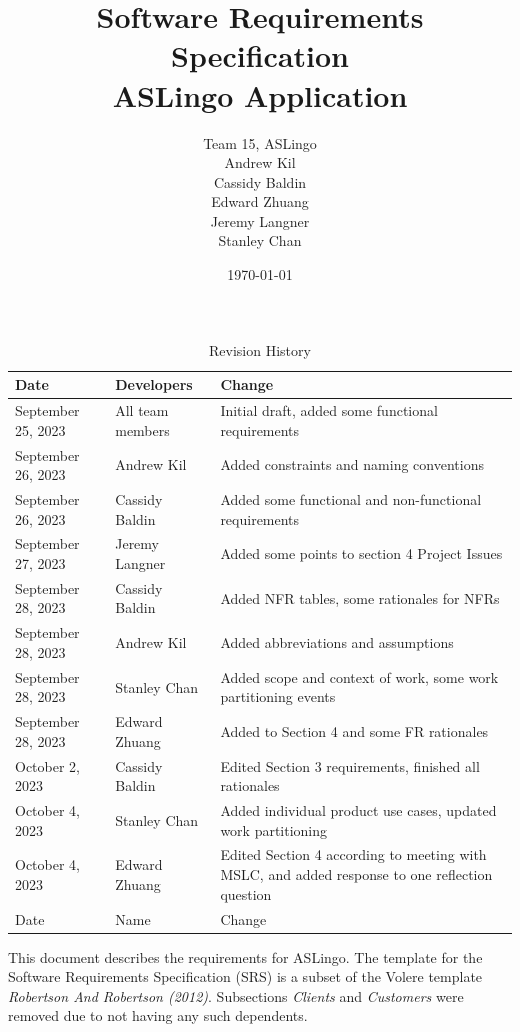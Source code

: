 \documentclass[12pt, titlepage]{article}
\title{Software Requirements Specification\\ASLingo Application}
\author{Team 15, ASLingo
		\\ Andrew Kil
		\\ Cassidy Baldin
		\\ Edward Zhuang
		\\ Jeremy Langner
		\\ Stanley Chan
}
\date{\today}
\begin{document}
\maketitle

\tableofcontents
\listoftables
\listoffigures

\begin{table}[H]
\caption{Revision History}
\begin{tabularx}{\textwidth}{|l|l|X|}
\hline {\bf Date} & {\bf Developers} & {\bf Change}\\
\hline
September 25, 2023 & All team members & Initial draft, added some functional requirements \\
September 26, 2023 & Andrew Kil & Added constraints and naming conventions \\
September 26, 2023 & Cassidy Baldin & Added some functional and non-functional requirements \\
September 27, 2023 & Jeremy Langner & Added some points to section 4 Project Issues \\
September 28, 2023 & Cassidy Baldin & Added NFR tables, some rationales for NFRs \\
September 28, 2023 & Andrew Kil & Added abbreviations and assumptions \\
September 28, 2023 & Stanley Chan & Added scope and context of work, some work partitioning events \\
September 28, 2023 & Edward Zhuang & Added to Section 4 and some FR rationales \\
October 2, 2023 & Cassidy Baldin & Edited Section 3 requirements, finished all rationales \\
October 4, 2023 & Stanley Chan & Added individual product use cases, updated work partitioning \\
October 4, 2023 & Edward Zhuang & Edited Section 4 according to meeting with MSLC, and added response to one reflection question \\
Date & Name & Change\\
\bottomrule
\end{tabularx}
\end{table}

\newpage


This document describes the requirements for ASLingo. The template for the Software
Requirements Specification (SRS) is a subset of the Volere
template \textit{Robertson And Robertson (2012)}.  Subsections \textit{Clients} and \textit{Customers} were removed due to not having any such dependents.
\end{document}
